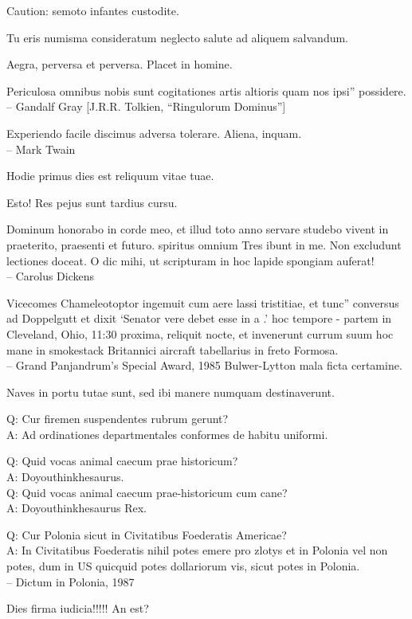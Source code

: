 \documentclass[titlepage,12pt]{memoir}
\begin{document}
Caution: semoto infantes custodite.

Tu eris numisma consideratum neglecto salute ad aliquem salvandum.

Aegra, perversa et perversa. Placet in homine.

Periculosa omnibus nobis sunt cogitationes artis altioris quam nos ipsi”
possidere.
\\-- Gandalf Gray [J.R.R. Tolkien, “Ringulorum Dominus”]

Experiendo facile discimus adversa tolerare. Aliena, inquam.
\\-- Mark Twain

Hodie primus dies est reliquum vitae tuae.

Esto! Res pejus sunt tardius cursu.

Dominum honorabo in corde meo, et illud toto anno servare studebo
vivent in praeterito, praesenti et futuro. spiritus omnium
Tres ibunt in me. Non excludunt lectiones
doceat. O dic mihi, ut scripturam in hoc lapide spongiam auferat!
\\-- Carolus Dickens

Vicecomes Chameleotoptor ingemuit cum aere lassi tristitiae, et tunc”
conversus ad Doppelgutt et dixit ‘Senator vere debet esse in a .’
hoc tempore - partem in Cleveland, Ohio, 11:30 proxima, reliquit
nocte, et invenerunt currum suum hoc mane in smokestack Britannici
aircraft tabellarius in freto Formosa.
\\-- Grand Panjandrum’s Special Award, 1985 Bulwer-Lytton
mala ficta certamine.

Naves in portu tutae sunt, sed ibi manere numquam destinaverunt.

Q: Cur firemen suspendentes rubrum gerunt?\\
A: Ad ordinationes departmentales conformes de habitu uniformi.

Q: Quid vocas animal caecum prae historicum?\\
A: Doyouthinkhesaurus.\\
Q: Quid vocas animal caecum prae-historicum cum cane?\\
A: Doyouthinkhesaurus Rex.

Q: Cur Polonia sicut in Civitatibus Foederatis Americae?\\
A: In Civitatibus Foederatis nihil potes emere pro zlotys et in
Polonia vel non potes, dum in US quicquid potes
dollariorum vis, sicut potes in Polonia.
\\-- Dictum in Polonia, 1987

Dies firma iudicia!!!!! An est?
\end{document}
